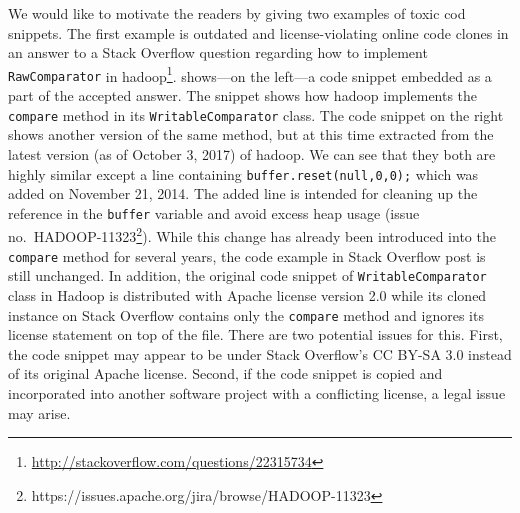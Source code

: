 \documentclass[10pt,journal,compsoc]{IEEEtran}
\begin{document}
We would like to motivate the readers by giving two examples of toxic
cod snippets.
The first example is outdated and license-violating online code clones in an
answer to a Stack Overflow question regarding how to implement
{\small{\texttt{RawComparator}}} in
\textsf{hadoop}\footnote{\url{http://stackoverflow.com/questions/22315734}}.
 shows---on the left---a code snippet embedded as a part
of the accepted answer. The snippet shows how \textsf{hadoop} implements the
{\small{\texttt{compare}}} method in its {\small{\texttt{WritableComparator}}}
class. The code snippet on the right shows another version of the same method,
but at this time extracted from the latest version (as of October 3, 2017) of
\textsf{hadoop}. We can see that they both are highly similar except a line
containing {\small{\verb|buffer.reset(null,0,0);|}} which was added on November
21, 2014. The added line is intended for cleaning up the reference in the
{\small{\verb|buffer|}} variable and avoid excess heap usage
(issue no.~HADOOP-11323\footnote{https://issues.apache.org/jira/browse/HADOOP-11323}).
While this change has already been introduced into the
{\small{\texttt{compare}}} method for several years, the code example in Stack
Overflow post is still unchanged. 
In addition, the original code snippet of
{\small\texttt{WritableComparator}} class in Hadoop is distributed with Apache license
version 2.0 while its cloned instance on Stack Overflow contains only the
{\small{\texttt{compare}}} method and ignores its license statement on top of the
file. There are two potential issues for this. First, the code snippet may appear to be 
under Stack Overflow's CC BY-SA 3.0 instead of its original Apache
license. Second, if the code snippet is copied and incorporated into another
software project with a conflicting license, a legal issue may arise.
\end{document}
